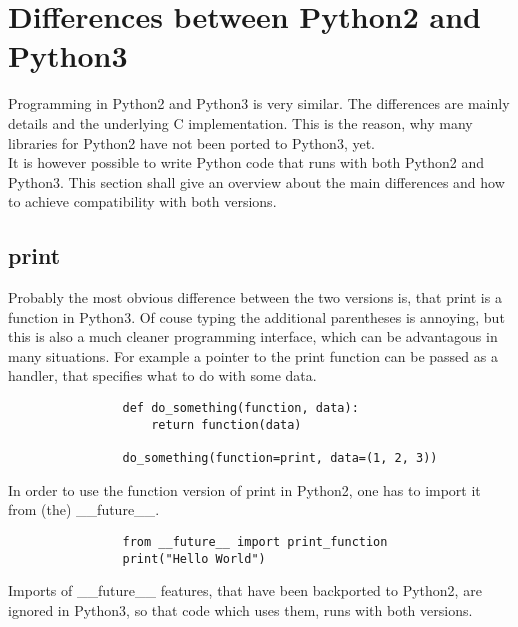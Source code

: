 	\section{Differences between Python2 and Python3}
		Programming in Python2 and Python3 is very similar.
		The differences are mainly details and the underlying C implementation.
		This is the reason, why many libraries for Python2 have not been ported to Python3, yet.\\
		It is however possible to write Python code that runs with both Python2 and Python3.
		This section shall give an overview about the main differences and how to achieve compatibility with both versions.

		\subsection{print}
			Probably the most obvious difference between the two versions is, that {\normalfont \ttfamily print} is a function in Python3.
			Of couse typing the additional parentheses is annoying, but this is also a much cleaner programming interface, which can be advantagous in many situations.
			For example a pointer to the {\normalfont \ttfamily print} function can be passed as a handler, that specifies what to do with some data.
			\begin{verbatim}
				def do_something(function, data):
					return function(data)

				do_something(function=print, data=(1, 2, 3))
			\end{verbatim}

			In order to use the function version of {\normalfont \ttfamily print} in Python2, one has to import it from (the) {\normalfont \ttfamily \_\_future\_\_}.
			\begin{verbatim}
				from __future__ import print_function
				print("Hello World")
			\end{verbatim}
			Imports of {\normalfont \ttfamily \_\_future\_\_} features, that have been backported to Python2, are ignored in Python3, so that code which uses them, runs with both versions.

